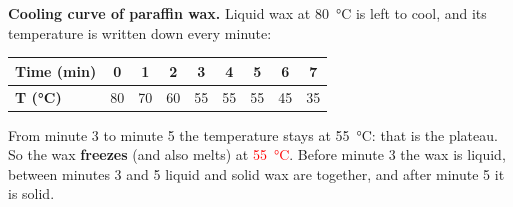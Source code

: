 \begin{example}
    \textbf{Cooling curve of paraffin wax.} Liquid wax at \qty{80}{\celsius} is left to cool, and its temperature is written down every minute:
    \begin{center}
        \renewcommand{\arraystretch}{1.3}
        \begin{tabular}{@{}lcccccccc@{}}
            \toprule
            \textbf{Time (min)} & \textbf{0} & \textbf{1} & \textbf{2} & \textbf{3} & \textbf{4} & \textbf{5} & \textbf{6} & \textbf{7} \\
            \midrule
            \textbf{T (\unit{\celsius})} & 80 & 70 & 60 & 55 & 55 & 55 & 45 & 35 \\
            \bottomrule
        \end{tabular}
    \end{center}
    From minute 3 to minute 5 the temperature stays at \qty{55}{\celsius}: that is the plateau. So the wax \textbf{freezes} (and also melts) at \textcolor{red}{\qty{55}{\celsius}}. Before minute 3 the wax is liquid, between minutes 3 and 5 liquid and solid wax are together, and after minute 5 it is solid.
\end{example}

